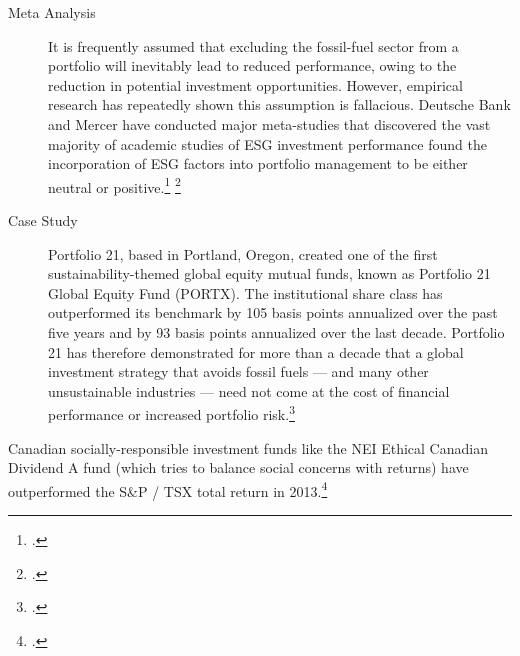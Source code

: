 \documentclass[10pt]{article}
\begin{document}
\begin{description}
\begin{quote}
\end{quote}
  \item[Meta Analysis] It is frequently assumed that excluding the fossil-fuel sector from a portfolio will inevitably lead to reduced performance, owing to the reduction in potential investment opportunities.
  However, empirical research has repeatedly shown this assumption is fallacious.
  Deutsche Bank and Mercer have conducted major meta-studies that discovered the vast majority of academic studies of ESG investment performance found the incorporation of ESG factors into portfolio management to be either neutral or positive.\footcite{DeutscheBankSI} \footcite{MercerRI}
  \item[Case Study] Portfolio 21, based in Portland, Oregon, created one of the first sustainability-themed global equity mutual funds, known as Portfolio 21 Global Equity Fund (PORTX). The institutional share class has outperformed its benchmark by 105 basis points annualized over the past five years and by 93 basis points annualized over the last decade. Portfolio 21 has therefore demonstrated for more than a decade that a global investment strategy that avoids fossil fuels --- and many other unsustainable industries --- need not come at the cost of financial performance or increased portfolio risk.\footcite{FossilFreeInvesting}
\end{description}
Canadian socially-responsible investment funds like the NEI Ethical Canadian Dividend A fund (which tries to balance social concerns with returns) have outperformed the S\&P / TSX total return in 2013.\footcite[][]{HoldTheirOwn}
\end{document}
